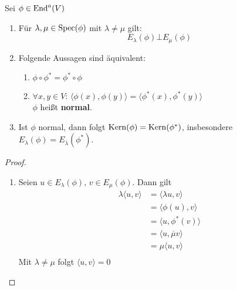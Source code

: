 \documentclass[parskip,a4paper,twoside,DIV15,BCOR12mm]{scrbook}
\begin{document}
\begin{proposition}
Sei \(\phi\in\operatorname{End}^{a}(V)\)
\begin{enumerate}
\item Für \(\lambda,\mu\in\operatorname{Spec}(\phi)\) mit \(\lambda\neq\mu\) gilt:
\[
E_{\lambda}(\phi)\bot E_{\mu}(\phi)
\]
\item Folgende Aussagen sind äquivalent:
    \begin{enumerate}
    \item\(\phi\circ\phi^{*}=\phi^{*}\circ\phi\)
    \item\(\forall x,y\in V:\,\langle\phi(x),\phi(y)\rangle=\langle\phi^{*}(x),\phi^{*}(y)\rangle\)\\
    \(\phi\) heißt \textbf{normal}.
    \end{enumerate}
\item Ist \(\phi\) normal, dann folgt \(\operatorname{Kern}(\phi)=\operatorname{Kern}(\phi^{*})\), 
insbesondere \(E_{\lambda}(\phi)=E_{\overline{\lambda}}(\phi^{*})\).
\end{enumerate}
\end{proposition}
\begin{proof}
\begin{enumerate}
\item Seien \(u\in E_{\lambda}(\phi),\,v\in E_{\mu}(\phi)\). Dann gilt
\begin{align*}
\lambda\langle u,v\rangle&=\langle\lambda u,v\rangle\\
&=\langle\phi(u),v\rangle\\
&=\langle u,\phi^{*}(v)\rangle\\
&=\langle u,\overline{\mu}v\rangle\\
&=\mu\langle u,v\rangle\\
\end{align*}
Mit \(\lambda\neq\mu\) folgt \(\langle u,v\rangle=0\)
\end{enumerate}
\end{proof}
\end{document}
